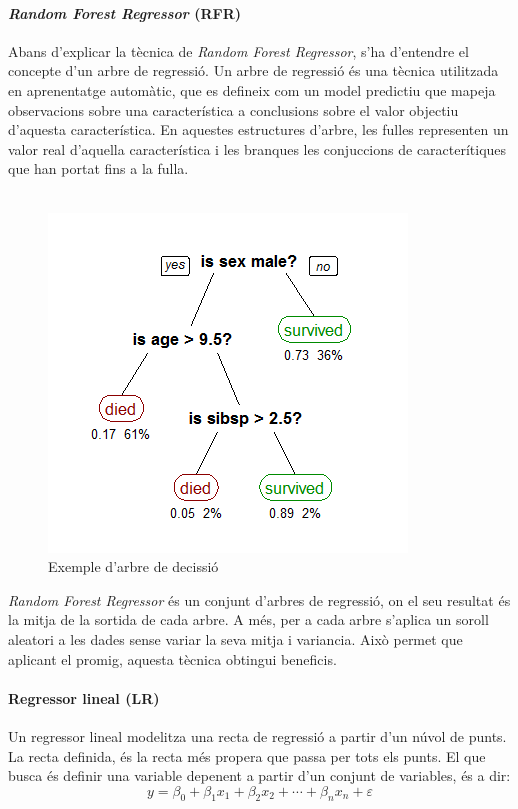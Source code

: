 \documentclass[12pt,a4paper,catalan]{article}
\begin{document}
\paragraph{\textit{Random Forest Regressor} (RFR)}
Abans d'explicar la tècnica de \textit{Random Forest Regressor}, s'ha d'entendre el concepte d'un arbre de regressió. Un arbre de regressió és una tècnica utilitzada en aprenentatge automàtic, que es defineix com un model predictiu que mapeja observacions sobre una característica a conclusions sobre el valor objectiu d'aquesta característica. En aquestes estructures d'arbre, les fulles representen un valor real d'aquella característica i les branques les conjuccions de caracterítiques que han portat fins a la fulla.
\\
\\
\begin{figure}[h]
\centering
\includegraphics[width=.5\linewidth]{img/randomforest.png}
\caption{Exemple d'arbre de decissió \cite{imgrandomforestregressor}}
\end{figure}

\textit{Random Forest Regressor} \cite{randomforestregressor} és un conjunt d'arbres de regressió, on el seu resultat és la mitja de la sortida de cada arbre. A més, per a cada arbre s'aplica un soroll aleatori a les dades sense variar la seva mitja i variancia. Això permet que aplicant el promig, aquesta tècnica obtingui beneficis.

\newpage

\paragraph{Regressor lineal (LR)}
Un regressor lineal \cite{linearregressor} modelitza una recta de regressió a partir d'un núvol de punts. La recta definida, és la recta més propera que passa per tots els punts. El que busca és definir una variable depenent a partir d'un conjunt de variables, és a dir:
$$
y =\beta_0+\beta_1 x_1+\beta_2 x_2+ \cdots + \beta_n x_n + \varepsilon
$$
\end{document}
